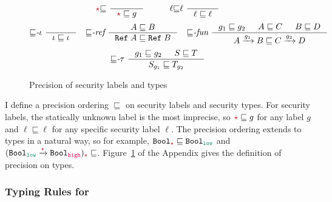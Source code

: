 \begin{figure}[tbp]
  \raggedright
  \begin{gather*}
    \unk{\sqsubseteq}~
    \inference{}{\unk \sqsubseteq g}
    \qquad\quad
    \ell{\sqsubseteq}\ell~
    \inference{}{\ell \sqsubseteq \ell}
  \end{gather*}
  \begin{gather*}
    {\sqsubseteq}\textit{-}\iota~
    \inference{}{\iota \sqsubseteq \iota}
    \quad
        {\sqsubseteq}\textit{-ref}~
        \inference{A \sqsubseteq B}{\Refer{A} \sqsubseteq \Refer{B}}
        \quad
            {\sqsubseteq}\textit{-fun}~
            \inference{g_1 \sqsubseteq g_2 &
              A \sqsubseteq C &
              B \sqsubseteq D}
                      {\Fun{A}{g_1}{B} \sqsubseteq \Fun{C}{g_2}{D}}
  \end{gather*}
  \begin{gather*}
    {\sqsubseteq}\textit{-}\tau~
    \inference{g_1 \sqsubseteq g_2 & S \sqsubseteq T}{S_{g_1} \sqsubseteq T_{g_2}}
  \end{gather*}
  \caption{Precision of security labels and types}
  \label{fig:type-prec}
\end{figure}

I define a precision ordering $\sqsubseteq$ on security labels and security
types. For security labels, the statically unknown label \unk is the most
imprecise, so $\unk \sqsubseteq g$ for any label $g$ and $\ell \sqsubseteq \ell$
for any specific security label $\ell$. The precision ordering extends to types
in a natural way, so for example, $\Bool_{\unk} \sqsubseteq \Bool_{\low}$ and
$(\Fun{\Bool_{\low}}{\unk}{\Bool_{\high}})_{\unk} \sqsubseteq $.
Figure~\ref{fig:type-prec} of the Appendix gives the definition of precision on
types.

\subsubsection{Typing Rules for \Surface}
\label{sec:surface-typing-rules}

